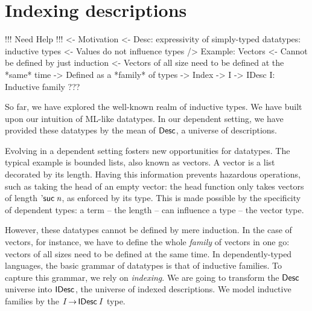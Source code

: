 \section{Indexing descriptions}
\label{sec:indexing-desc}

\begin{wstructure}
!!! Need Help !!!
<- Motivation
    <- Desc: expressivity of simply-typed datatypes: inductive types
        <- Values do not influence types
    /> Example: Vectors
        <- Cannot be defined by just induction
            <- Vectors of all size need to be defined at the *same* time
            -> Defined as a *family* of types
                -> Index
        -> I -> IDesc I: Inductive family
    ???
\end{wstructure}

So far, we have explored the well-known realm of inductive types. We
have built upon our intuition of ML-like datatypes. In our dependent
setting, we have provided these datatypes by the mean of $\Desc$, a
universe of descriptions.

Evolving in a dependent setting fosters new opportunities for
datatypes. The typical example is bounded lists, also known as
vectors. A vector is a list decorated by its length. Having this
information prevents hazardous operations, such as taking the head of
an empty vector: the head function only takes vectors of length
$\NatSuc{\V{n}}$, as enforced by its type. This is made possible by
the specificity of dependent types: a term -- the length -- can
influence a type -- the vector type.

However, these datatypes cannot be defined by mere induction. In the
case of vectors, for instance, we have to define the whole
\emph{family} of vectors in one go: vectors of all sizes need to be
defined at the same time. In dependently-typed languages, the basic
grammar of datatypes is that of inductive families. To capture this
grammar, we rely on \emph{indexing}. We are going to transform the
$\Desc$ universe into $\IDesc{\!}$, the universe of indexed
descriptions. We model inductive families by the $\V{I} \To
\IDesc{\V{I}}$ type.



